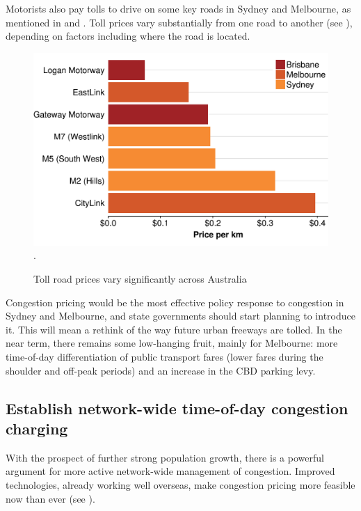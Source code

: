 \documentclass{grattan}
\begin{document}
Motorists also pay tolls to drive on some key roads in Sydney and Melbourne, as mentioned in  and .
Toll prices vary substantially from one road to another (see ), depending on factors including where the road is located.

\begin{figure}
\caption{Toll road prices vary significantly across Australia}\label{fig:toll-road-pricing}
\includegraphics{atlas/TollPrices-freeway-SYD-MEL-1.pdf}
%
{\textcite{BITRE-toll-roads-in-Australia}.}
\end{figure}

Congestion pricing would be the most effective policy response to congestion in Sydney and Melbourne, and state governments should start planning to introduce it. This will mean a rethink of the way future urban freeways are tolled. In the near term, there remains some low-hanging fruit, mainly for Melbourne: more time-of-day differentiation of public transport fares (lower fares during the shoulder and off-peak periods) and an increase in the CBD parking levy.

\subsection{Establish network-wide time-of-day congestion charging}

With the prospect of further strong population growth, there is a powerful argument for more active network-wide management of congestion.
Improved technologies, already working well overseas, make congestion pricing more feasible now than ever (see ).
\end{document}
